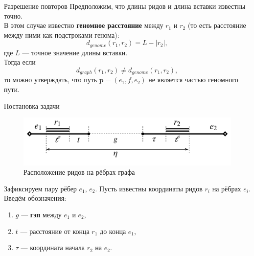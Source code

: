 \documentclass[unicode, notheorems]{beamer}
\begin{document}
\begin{frame}{Разрешение повторов}
	Предположим, что длины ридов и длина вставки известны точно.\\
	\vspace{0.3cm}
	В этом случае известно \textbf{геномное расстояние} между $r_1$ и $r_2$ (то есть расстояние между ними как подстроками генома):\\
	\begin{equation*}
		d_{genome}(r_1, r_2) = L - |r_2|,
	\end{equation*}
	где $L$ --- точное значение длины вставки.\\
	\vspace{0.3cm}
	Тогда если \[d_{graph}(r_1, r_2) \ne d_{genome}(r_1, r_2),\] то можно утверждать, что путь $\mathbf{p} = (e_1, f, e_2)$ не является частью геномного пути.
\end{frame}

\begin{frame}{Постановка задачи}
	\begin{figure}	
		\centering
		\includegraphics[scale=0.05]{img/alignment_shifted}
		\caption{Расположение ридов на рёбрах графа}
	\end{figure}

	Зафиксируем пару рёбер $e_1$, $e_2$. Пусть известны координаты ридов $r_i$ на рёбрах $e_i$. Введём обозначения: 
	\begin{enumerate}
		\item $g$ --- \textbf{гэп} между $e_1$ и $e_2$,
		\item $t$ --- расстояние от конца $r_1$ до конца $e_1$,
		\item $\tau$ --- координата начала $r_2$ на $e_2$.
	\end{enumerate}
\end{frame}
\end{document}
